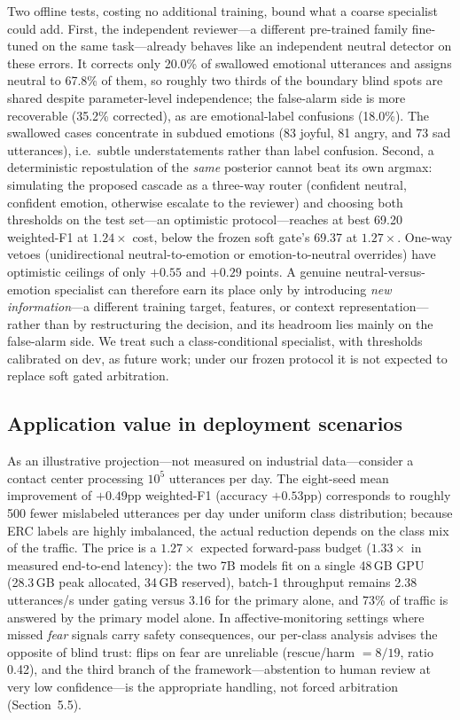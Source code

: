 \documentclass[final,5p,times,twocolumn]{elsarticle}
\begin{document}
Two offline tests, costing no additional training, bound what a coarse
specialist could add. First, the independent reviewer---a different
pre-trained family fine-tuned on the same task---already behaves like an
independent neutral detector on these errors. It corrects only 20.0\% of
swallowed emotional utterances and assigns neutral to 67.8\% of them, so
roughly two thirds of the boundary blind spots are shared despite
parameter-level independence; the false-alarm side is more recoverable
(35.2\% corrected), as are emotional-label confusions (18.0\%). The
swallowed cases concentrate in subdued emotions (83 joyful, 81 angry, and
73 sad utterances), i.e.\ subtle understatements rather than label
confusion. Second, a deterministic repostulation of the \emph{same}
posterior cannot beat its own argmax: simulating the proposed cascade as a
three-way router (confident neutral, confident emotion, otherwise escalate
to the reviewer) and choosing both thresholds on the test set---an
optimistic protocol---reaches at best 69.20 weighted-F1 at $1.24\times$
cost, below the frozen soft gate's 69.37 at $1.27\times$. One-way vetoes
(unidirectional neutral-to-emotion or emotion-to-neutral overrides) have
optimistic ceilings of only $+0.55$ and $+0.29$ points. A genuine
neutral-versus-emotion specialist can therefore earn its place only by
introducing \emph{new information}---a different training target, features,
or context representation---rather than by restructuring the decision, and
its headroom lies mainly on the false-alarm side. We treat such a
class-conditional specialist, with thresholds calibrated on dev, as future
work; under our frozen protocol it is not expected to replace soft gated
arbitration.

\subsection{Application value in deployment scenarios}
As an illustrative projection---not measured on industrial data---consider
a contact center processing $10^5$ utterances per day. The eight-seed mean
improvement of $+0.49$pp weighted-F1 (accuracy $+0.53$pp) corresponds to
roughly 500 fewer mislabeled utterances per day under uniform class
distribution; because ERC labels are highly imbalanced, the actual reduction
depends on the class mix of the traffic. The price is a $1.27\times$ expected
forward-pass budget ($1.33\times$ in measured end-to-end latency): the two 7B
models fit on a single 48\,GB GPU (28.3\,GB peak allocated, 34\,GB
reserved), batch-1 throughput remains 2.38 utterances/s under gating versus
3.16 for the primary alone, and 73\% of traffic is answered by the primary
model alone. In
affective-monitoring settings where missed \emph{fear} signals carry safety
consequences, our per-class analysis advises the opposite of blind trust:
flips on fear are unreliable (rescue/harm $=8/19$, ratio 0.42), and the third branch of
the framework---abstention to human review at very low confidence---is the
appropriate handling, not forced arbitration (Section~5.5).
\end{document}
